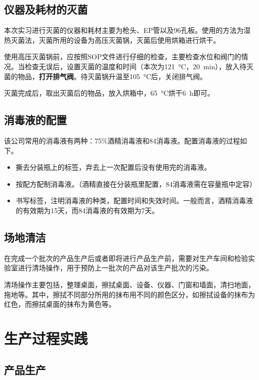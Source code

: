 \subsection{仪器及耗材的灭菌}

本次实习进行灭菌的仪器和耗材主要为枪头、EP管以及96孔板。使用的方法为湿热灭菌法，灭菌所用的设备为高压灭菌锅，灭菌后使用烘箱进行烘干。

使用高压灭菌锅前，应按照SOP文件进行仔细的检查，主要检查水位和阀门的情况。当检查无误后，设置灭菌的温度和时间（本次为\SI{121}{\celsius}，\SI{20}{\minute}），放入待灭菌的物品，\textbf{打开排气阀}。待灭菌锅升温至\SI{105}{\celsius}后，关闭排气阀。

灭菌完成后，取出灭菌后的物品，放入烘箱中，\SI{65}{\celsius}烘干\SI{6}{\hour}即可。

\subsection{消毒液的配置}

该公司常用的消毒液有两种：75\%酒精消毒液和84消毒液。配置消毒液的过程如下。

\begin{itemize}
    \item 撕去分装瓶上的标签，弃去上一次配置后没有使用完的消毒液。
    \item 按配方配制消毒液。（酒精直接在分装瓶里配置，84消毒液需在容量瓶中定容）
    \item 书写标签，注明消毒液的种类，配置时间和失效时间。一般而言，酒精消毒液的有效期为15天，而84消毒液的有效期为7天。
\end{itemize}

\subsection{场地清洁}

在完成一个批次的产品生产后或者即将进行产品生产前，需要对生产车间和检验实验室进行清场操作，用于预防上一批次的产品对该生产批次的污染。

清场操作主要包括，整理桌面，擦拭桌面、设备、仪器、门窗和墙面，清扫地面，拖地等。其中，擦拭不同部分所用的抹布用不同的颜色区分，如擦拭设备的抹布为红色，而擦拭桌面的抹布为黄色等。


\section{生产过程实践}

\subsection{产品生产}

